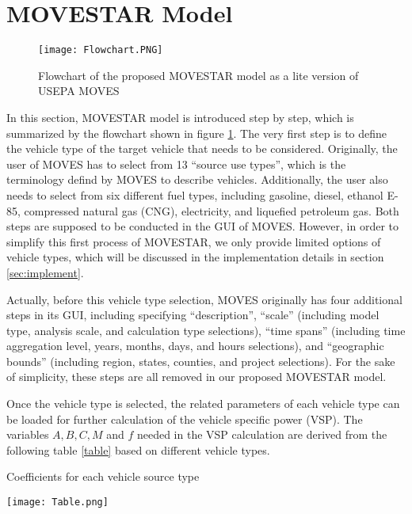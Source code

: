 \documentclass{article}
\begin{document}

\section{MOVESTAR Model}
\label{sec:moves}
	
	\begin{figure}[ht!]
        \centering
        \texttt{[image: Flowchart.PNG]}
        \caption{Flowchart of the proposed MOVESTAR model as a lite version of USEPA MOVES}
        \label{flow}
    \end{figure}
    
	In this section, MOVESTAR model is introduced step by step, which is summarized by the flowchart shown in figure \ref{flow}. The very first step is to define the vehicle type of the target vehicle that needs to be considered. Originally, the user of MOVES has to select from 13 ``source use types'', which is the terminology defind by MOVES to describe vehicles. Additionally, the user also needs to select from six different fuel types, including gasoline, diesel, ethanol E-85, compressed natural gas (CNG), electricity, and liquefied petroleum gas. Both steps are supposed to be conducted in the GUI of MOVES. However, in order to simplify this first process of MOVESTAR, we only provide limited options of vehicle types, which will be discussed in the implementation  details in section \ref{sec:implement}.
    
	Actually, before this vehicle type selection, MOVES originally has four additional steps in its GUI, including specifying ``description'', ``scale'' (including model type, analysis scale, and calculation type selections), ``time spans'' (including time aggregation level, years, months, days, and hours selections), and ``geographic bounds'' (including region, states, counties, and project selections). For the sake of simplicity, these steps are all removed in our proposed MOVESTAR model.
	
	Once the vehicle type is selected, the related parameters of each vehicle type can be loaded for further calculation of the vehicle specific power (VSP). The variables $A, B, C, M$ and $f$ needed in the VSP calculation are derived from the following table \ref{table} based on different vehicle types.
    
    \begin{table}[ht!]
        \centering
        \caption{Coefficients for each vehicle source type}
        \texttt{[image: Table.png]}
        \label{table}
    \end{table}
	
\end{document}
